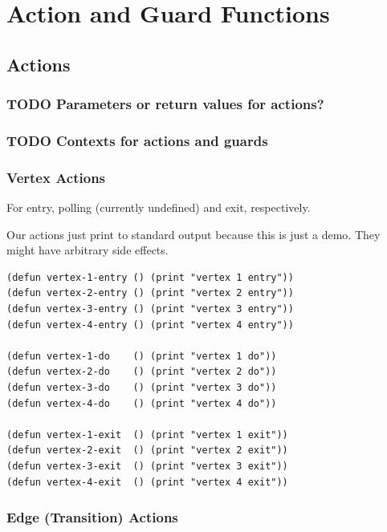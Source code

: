 \documentclass[10pt,oneside,x11names]{article}
\begin{document}
\section{Action and Guard Functions}
\label{sec:org10f4702}

\subsection{Actions}
\label{sec:org670e11c}

\subsubsection{{\bfseries\sffamily TODO} Parameters or return values for actions?}
\label{sec:org5e2356a}

\subsubsection{{\bfseries\sffamily TODO} Contexts for actions and guards}
\label{sec:org67427bb}

\subsubsection{Vertex Actions}
\label{sec:org04f5536}

For entry, polling (currently undefined) and exit, respectively.

Our actions just print to standard output because this is just a demo.  They
might have arbitrary side effects.

\begin{verbatim}
(defun vertex-1-entry () (print "vertex 1 entry"))
(defun vertex-2-entry () (print "vertex 2 entry"))
(defun vertex-3-entry () (print "vertex 3 entry"))
(defun vertex-4-entry () (print "vertex 4 entry"))

(defun vertex-1-do    () (print "vertex 1 do"))
(defun vertex-2-do    () (print "vertex 2 do"))
(defun vertex-3-do    () (print "vertex 3 do"))
(defun vertex-4-do    () (print "vertex 4 do"))

(defun vertex-1-exit  () (print "vertex 1 exit"))
(defun vertex-2-exit  () (print "vertex 2 exit"))
(defun vertex-3-exit  () (print "vertex 3 exit"))
(defun vertex-4-exit  () (print "vertex 4 exit"))
\end{verbatim}

\subsubsection{Edge (Transition) Actions}
\label{sec:orgf2d828e}
\end{document}
